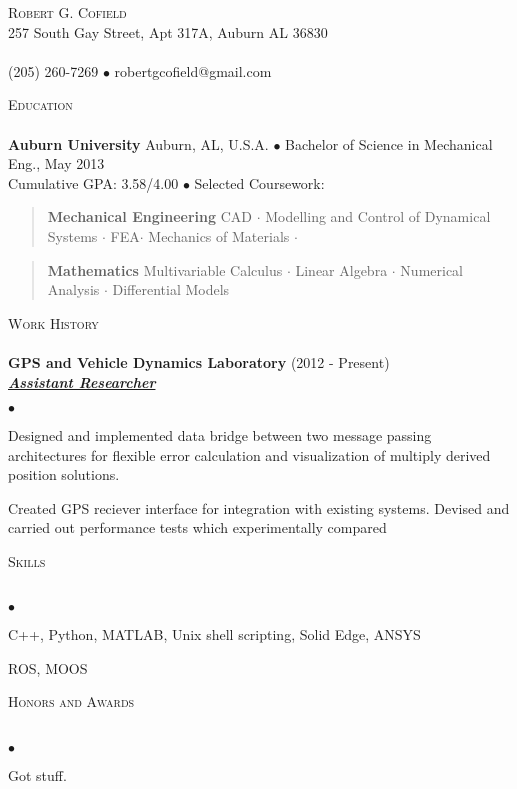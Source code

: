 \documentclass{article}
\newcommand{\area}[2]{\vspace*{-9pt} \begin{verse}\textbf{#1}   #2 \end{verse}  }
\newcommand{\lineunder}{\vspace*{-8pt} \\ \hspace*{-18pt} \hrulefill \\}
\newcommand{\header}[1]{{\hspace*{-15pt}\vspace*{6pt} \textsc{#1}} \vspace*{-6pt} \lineunder}
\newcommand{\employer}[3]{{ \textbf{#1} (#2)\\ \underline{\textbf{\emph{#3}}}\\  }}
\newcommand{\contact}[3]{
\vspace*{-8pt}
\begin{center}
{\LARGE \scshape {#1}}\\
#2 \lineunder 
#3
\end{center}
\vspace*{-8pt}
}
\newenvironment{achievements}{\begin{list}{$\bullet$}{\topsep 0pt \itemsep -2pt}}{\vspace*{4pt}\end{list}}
\newcommand{\schoolwithcourses}[4]{
 \textbf{#1} #2 $\bullet$ #3\\ 
#4 $\bullet$  Selected Coursework:\\
\vspace*{5pt}
}
\begin{document}
\small
\smallskip
\vspace*{-44pt}

\contact{Robert G. Cofield}
{257 South Gay Street, Apt 317A, Auburn AL 36830}
{(205) 260-7269 $\bullet$ robertgcofield@gmail.com}

\header{Education}

\schoolwithcourses{Auburn University}{Auburn, AL, U.S.A.}{Bachelor of Science in Mechanical Eng., May 2013}
{Cumulative GPA: 3.58/4.00}
	\area{Mechanical Engineering}{ CAD $\cdot$ Modelling and Control of Dynamical Systems $\cdot$ FEA$\cdot$ Mechanics of Materials $\cdot$ }
	\area{Mathematics}{Multivariable Calculus $\cdot$ Linear Algebra $\cdot$ Numerical Analysis $\cdot$ Differential Models}

\header{Work History}
\employer{GPS and Vehicle Dynamics Laboratory}{2012 - Present}{Assistant Researcher}
	\begin{achievements}
	\item Designed and implemented data bridge between two message passing architectures for flexible error calculation and visualization of multiply derived position solutions.
	\item Created GPS reciever interface for integration with existing systems. Devised and carried out performance tests which experimentally compared 
	\item 
	\end{achievements}



\header{Skills}
\begin{achievements}
\item C++, Python, MATLAB, Unix shell scripting, Solid Edge, ANSYS
\item ROS, MOOS
\end{achievements}

\header{Honors and Awards}
\begin{achievements}
\item  Got stuff.
\end{achievements}
\end{document}
